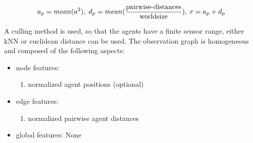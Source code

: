 \begin{equation} 
    a_p = mean(a^2),\; d_p =  mean(\frac{\textup{pairwise-distances}}{\textup{worldsize}}),\; r = a_p + d_p \nonumber
\end{equation}

A culling method is used, so that the agents have a finite sensor range, either kNN or euclidean distance can be used. The observation graph is homogeneous and composed of the following aspects:
\begin{itemize}[noitemsep,nolistsep]
    \item node features:
    \begin{enumerate}
        \item normalized agent positions (optional)
    \end{enumerate} 
    \item edge features:
    \begin{enumerate}
        \item normalized pairwise agent distances
    \end{enumerate} 
    \item global features: None
\end{itemize}



